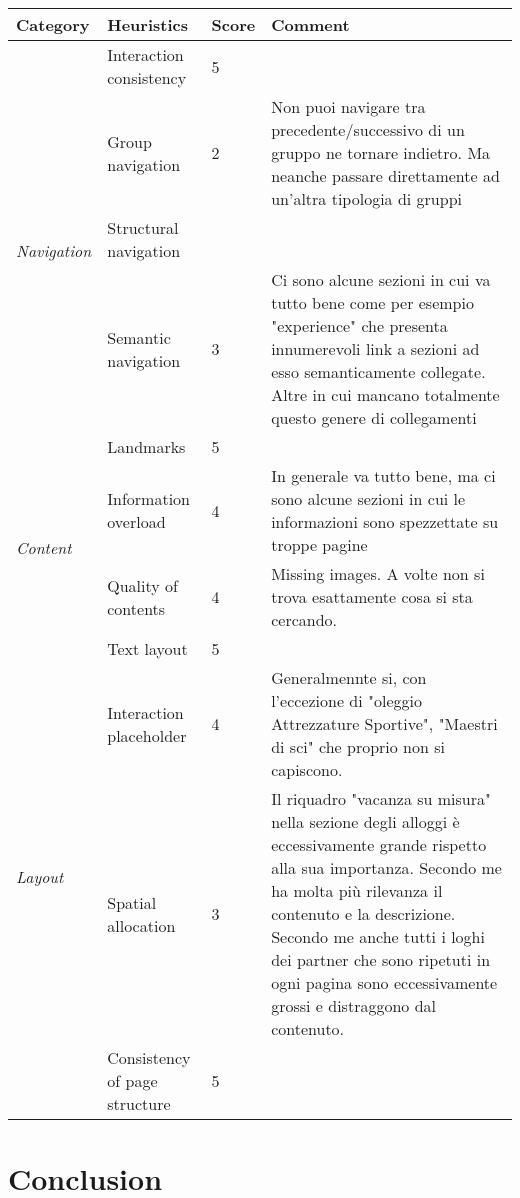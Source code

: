 \documentclass[a4paper, 11pt, parskip=half]{scrreprt}
\begin{document}
\begin{center}
    \def\arraystretch{1.3}
    \begin{tabular}{|l|l|l|m{7cm}|}
        \hline
        \textbf{Category} & \textbf{Heuristics} & \textbf{Score} & \textbf{Comment} \\ \hline
        \multirow{5}{*}{\textit{Navigation}} 
        & Interaction consistency & 5 & \\ \cline{2-4}
        & Group navigation & 2 & Non puoi navigare tra precedente/successivo di un gruppo ne tornare indietro. Ma neanche passare direttamente ad un'altra tipologia di gruppi\\ \cline{2-4}
        & Structural navigation &  & \\ \cline{2-4}
        & Semantic navigation & 3 & Ci sono alcune sezioni in cui va tutto bene come per esempio "experience" che presenta innumerevoli link a sezioni ad esso semanticamente collegate. Altre in cui mancano totalmente questo genere di collegamenti\\ \cline{2-4}
        & Landmarks & 5 & \\ \hline
        \multirow{2}{*}{\textit{Content}} & Information overload & 4 & In generale va tutto bene, ma ci sono alcune sezioni in cui le informazioni sono spezzettate su troppe pagine\\ \cline{2-4}
        & Quality of contents & 4 & Missing images. A volte non si trova esattamente cosa si sta cercando. 							\\ \hline
        \multirow{4}{*}{\textit{Layout}} & Text layout & 5 & \\ \cline{2-4}
        & Interaction placeholder & 4 & Generalmennte si, con l'eccezione di "oleggio Attrezzature Sportive", "Maestri di sci" che proprio non si capiscono.\\ \cline{2-4}
        & Spatial allocation & 3 & Il riquadro "vacanza su misura" nella sezione degli alloggi è eccessivamente grande rispetto alla sua importanza. Secondo me ha molta più rilevanza il contenuto e la descrizione. Secondo me anche tutti i loghi dei partner che sono ripetuti in ogni pagina sono eccessivamente grossi e distraggono dal contenuto.\\ \cline{2-4}
        & Consistency of page structure & 5 & \\ \hline
    \end{tabular}
\end{center}






\chapter{Conclusion}

\end{document}
